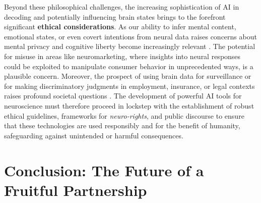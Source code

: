 Beyond these philosophical challenges, the increasing sophistication of AI in decoding and potentially influencing brain states brings to the forefront significant \textbf{ethical considerations}. As our ability to infer mental content, emotional states, or even covert intentions from neural data raises concerns about mental privacy and cognitive liberty become increasingly relevant \cite{richards2019deep}. The potential for misuse in areas like neuromarketing, where insights into neural responses could be exploited to manipulate consumer behavior in unprecedented ways, is a plausible concern. Moreover, the prospect of using brain data for surveillance or for making discriminatory judgments in employment, insurance, or legal contexts raises profound societal questions \cite{miller2019explanation}. The development of powerful AI tools for neuroscience must therefore proceed in lockstep with the establishment of robust ethical guidelines, frameworks for \textit{neuro-rights}, and public discourse to ensure that these technologies are used responsibly and for the benefit of humanity, safeguarding against unintended or harmful consequences.

\section{Conclusion: The Future of a Fruitful Partnership}

